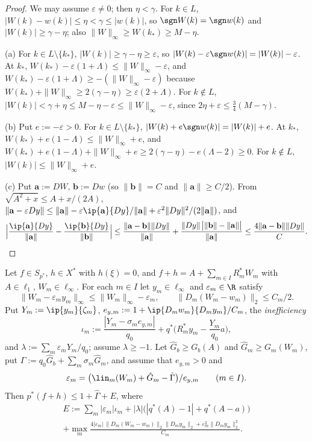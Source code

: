 \begin{proof}
We may assume $\varepsilon\ne0$; then $\eta<\gamma$.  For $k\in L$,
$|W(k)-w(k)|\le\eta<\gamma\le|w(k)|$, so $\sgn W(k)=\sgn w(k)$ and
$|W(k)|\ge\gamma-\eta$; also $\|W\|_\infty\ge W(k_*)\ge M-\eta$.

(a) For $k\in L\setminus\{k_*\}$, $|W(k)|\ge\gamma-\eta\ge\varepsilon$, so
$|W(k)-\varepsilon\sgn w(k)|=|W(k)|-\varepsilon$.  At $k_*$,
$W(k_*)-\varepsilon(1+\Lambda)\le\|W\|_\infty-\varepsilon$, and
$W(k_*)-\varepsilon(1+\Lambda)\ge-(\|W\|_\infty-\varepsilon)$ because
$W(k_*)+\|W\|_\infty\ge2(\gamma-\eta)\ge\varepsilon(2+\Lambda)$.  For $k\notin
L$, $|W(k)|<\gamma+\eta\le M-\eta-\varepsilon\le\|W\|_\infty-\varepsilon$,
since $2\eta+\varepsilon\le\frac34(M-\gamma)$.

(b) Put $e:=-\varepsilon>0$.  For $k\in L\setminus\{k_*\}$,
$|W(k)+e\sgn w(k)|=|W(k)|+e$.  At $k_*$, $W(k_*)+e(1-\Lambda)\le
\|W\|_\infty+e$, and $W(k_*)+e(1-\Lambda)+\|W\|_\infty+e\ge2(\gamma-\eta)
-e(\Lambda-2)\ge0$.  For $k\notin L$, $|W(k)|\le\|W\|_\infty+e$.

(c) Put $\mathbf a:=DW$, $\mathbf b:=Dw$ (so $\|\mathbf b\|=C$ and
$\|\mathbf a\|\ge C/2$).  From $\sqrt{A^2+x}\le A+x/(2A)$,
$\|\mathbf a-\varepsilon Dy\|\le\|\mathbf a\|-\varepsilon\ip{\mathbf a}{Dy}/
\|\mathbf a\|+\varepsilon^2\|Dy\|^2/(2\|\mathbf a\|)$, and
\[
 \Big|\frac{\ip{\mathbf a}{Dy}}{\|\mathbf a\|}-\frac{\ip{\mathbf b}{Dy}}
 {\|\mathbf b\|}\Big|\le\frac{\|\mathbf a-\mathbf b\|\|Dy\|}{\|\mathbf a\|}
 +\frac{\|Dy\|\,\big|\|\mathbf b\|-\|\mathbf a\|\big|}{\|\mathbf a\|}
 \le\frac{4\|\mathbf a-\mathbf b\|\|Dy\|}{C}.\qedhere
\]
\end{proof}

\begin{proposition}[Rebalancing]\label{prop:rebalancing}
Let $f\in S_{p^*}$, $h\in X^*$ with $h(\xi)=0$, and
$f+h=A+\sum_{m\in I}R_m^*W_m$ with $A\in\ell_1$, $W_m\in\ell_\infty$.  For
each $m\in I$ let $y_m\in\ell_\infty$ and $\varepsilon_m\in\R$ satisfy
\begin{equation}\label{eq:R1}
 \|W_m-\varepsilon_my_m\|_\infty\le\|W_m\|_\infty-\varepsilon_m,\qquad
 \|D_m(W_m-w_m)\|_2\le C_m/2 .
\end{equation}
Put $Y_m:=\ip{y_m}{\zeta_m}$, $e_{y,m}:=1+\ip{D_mw_m}{D_my_m}/C_m$, the
\emph{inefficiency}
\[
 \iota_m:=\frac{|Y_m-\sigma_me_{y,m}|}{q_0}+q^*\Big(R_m^*y_m-\frac{Y_m}{q_0}a
 \Big),
\]
and $\lambda:=\sum_m\varepsilon_mY_m/q_0$; assume $\lambda\ge-1$.  Let
$\hat G_b\ge G_b(A)$ and $\hat G_m\ge G_m(W_m)$, put
$\hat\Gamma:=q_0\hat G_b+\sum_m\sigma_m\hat G_m$, and assume that $e_{y,m}>0$
and
\[
 \varepsilon_m=\big(\lin_m(W_m)+\hat G_m-\hat\Gamma\big)/e_{y,m}\qquad(m\in I).
\]
Then $p^*(f+h)\le1+\hat\Gamma+E$, where
\begin{multline*}
 E:=\sum_m|\varepsilon_m|\iota_m+|\lambda|\big(|q^*(A)-1|+q^*(A-a)\big)\\
 +\max_m\frac{4|\varepsilon_m|\,\|D_m(W_m-w_m)\|_2\|D_my_m\|_2
 +\varepsilon_m^2\|D_my_m\|_2^2}{C_m}.
\end{multline*}
\end{proposition}

